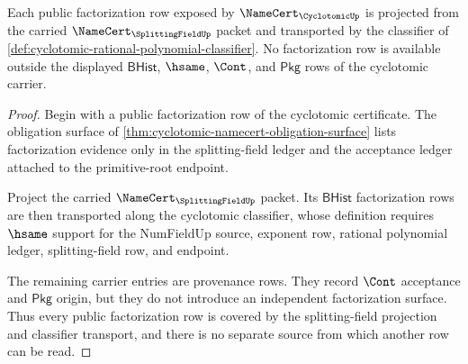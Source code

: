 \begin{theorem}
\label{thm:cyclotomic-factorization-ledger-coverage}
Each public factorization row exposed by $\NameCert_{\CyclotomicUp}$ is projected from the carried $\NameCert_{\SplittingFieldUp}$ packet and transported by the classifier of \autoref{def:cyclotomic-rational-polynomial-classifier}. No factorization row is available outside the displayed $\mathsf{BHist}$, $\hsame$, $\Cont$, and $\mathsf{Pkg}$ rows of the cyclotomic carrier.
\end{theorem}
\begin{proof}
Begin with a public factorization row of the cyclotomic certificate. The obligation surface of \autoref{thm:cyclotomic-namecert-obligation-surface} lists factorization evidence only in the splitting-field ledger and the acceptance ledger attached to the primitive-root endpoint.

Project the carried $\NameCert_{\SplittingFieldUp}$ packet. Its $\mathsf{BHist}$ factorization rows are then transported along the cyclotomic classifier, whose definition requires $\hsame$ support for the NumFieldUp source, exponent row, rational polynomial ledger, splitting-field row, and endpoint.

The remaining carrier entries are provenance rows. They record $\Cont$ acceptance and $\mathsf{Pkg}$ origin, but they do not introduce an independent factorization surface. Thus every public factorization row is covered by the splitting-field projection and classifier transport, and there is no separate source from which another row can be read.
\end{proof}

